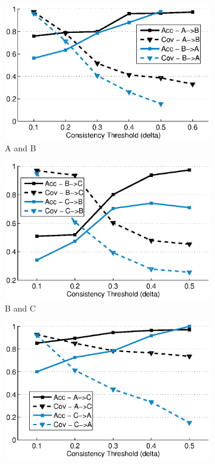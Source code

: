 \begin{figure}[ht!]
\centering
  \begin{subfigure}{0.32\textwidth}
                \centering
    \includegraphics[width=\textwidth]{./fig/TL_AB.eps}
                \caption{A and B}
  \end{subfigure}
  \begin{subfigure}{0.32\textwidth}
                \centering
    \includegraphics[width=\textwidth]{./fig/TL_BC.eps}
                \caption{B and C}
  \end{subfigure}
  \begin{subfigure}{0.32\textwidth}
                \centering
    \includegraphics[width=\textwidth]{./fig/TL_AC.eps}

\end{subfigure}
\end{figure}
